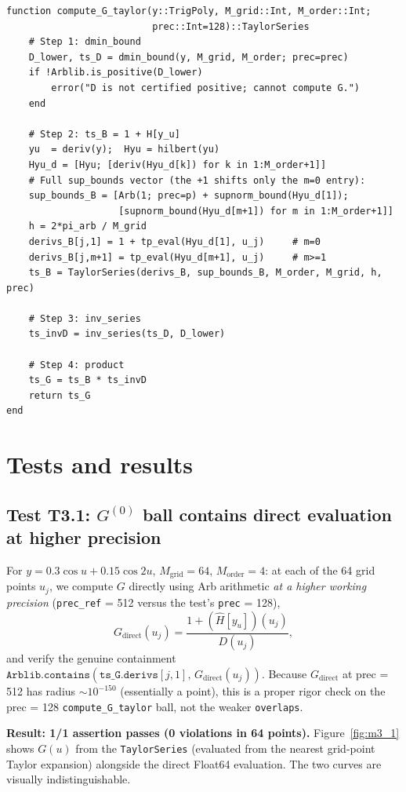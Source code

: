 \documentclass[11pt]{article}
\theoremstyle{definition}
\begin{document}
\begin{lstlisting}
function compute_G_taylor(y::TrigPoly, M_grid::Int, M_order::Int;
                          prec::Int=128)::TaylorSeries
    # Step 1: dmin_bound
    D_lower, ts_D = dmin_bound(y, M_grid, M_order; prec=prec)
    if !Arblib.is_positive(D_lower)
        error("D is not certified positive; cannot compute G.")
    end

    # Step 2: ts_B = 1 + H[y_u]
    yu  = deriv(y);  Hyu = hilbert(yu)
    Hyu_d = [Hyu; [deriv(Hyu_d[k]) for k in 1:M_order+1]]
    # Full sup_bounds vector (the +1 shifts only the m=0 entry):
    sup_bounds_B = [Arb(1; prec=p) + supnorm_bound(Hyu_d[1]);
                    [supnorm_bound(Hyu_d[m+1]) for m in 1:M_order+1]]
    h = 2*pi_arb / M_grid
    derivs_B[j,1] = 1 + tp_eval(Hyu_d[1], u_j)     # m=0
    derivs_B[j,m+1] = tp_eval(Hyu_d[m+1], u_j)     # m>=1
    ts_B = TaylorSeries(derivs_B, sup_bounds_B, M_order, M_grid, h, prec)

    # Step 3: inv_series
    ts_invD = inv_series(ts_D, D_lower)

    # Step 4: product
    ts_G = ts_B * ts_invD
    return ts_G
end
\end{lstlisting}

\section{Tests and results}

\subsection{Test T3.1: $G^{(0)}$ ball contains direct evaluation at higher precision}

For $y = 0.3\cos u + 0.15\cos 2u$, $M_{\mathrm{grid}} = 64$, $M_{\mathrm{order}} = 4$:
at each of the 64 grid points $u_j$, we compute $G$ directly using Arb arithmetic
\emph{at a higher working precision} (\texttt{prec\_ref} = 512 versus the test's
\texttt{prec} = 128),
\[
  G_{\mathrm{direct}}(u_j) = \frac{1 + (\hat H[y_u])(u_j)}{D(u_j)},
\]
and verify the genuine containment
$\texttt{Arblib.contains}(\texttt{ts\_G.derivs}[j,1],\, G_{\mathrm{direct}}(u_j))$.
Because $G_{\mathrm{direct}}$ at prec = 512 has radius $\sim 10^{-150}$
(essentially a point), this is a proper rigor check on the prec = 128
\texttt{compute\_G\_taylor} ball, not the weaker \texttt{overlaps}.

\textbf{Result: 1/1 assertion passes (0 violations in 64 points).}
Figure~\ref{fig:m3_1} shows $G(u)$ from the \texttt{TaylorSeries} (evaluated from
the nearest grid-point Taylor expansion) alongside the direct Float64 evaluation.
The two curves are visually indistinguishable.
\end{document}
